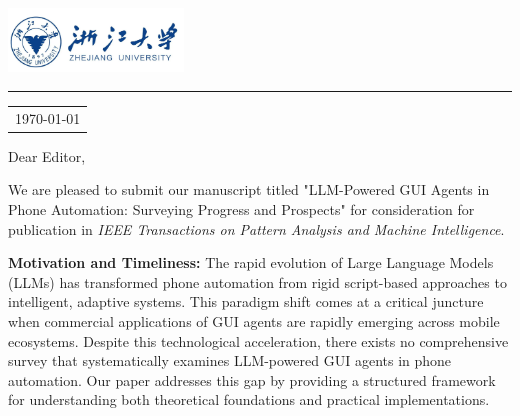 \documentclass{article}
\newcommand{\journal}{IEEE Transactions on Pattern Analysis and Machine Intelligence}
\newcommand{\papertitle}{LLM-Powered GUI Agents in Phone Automation: Surveying Progress and Prospects}
\begin{document}
\includegraphics[width=0.35\textwidth]{templete/zjulogo.png} %
\vspace{-1.5em} %
\rule{\linewidth}{1pt} %
\vspace{0.8em} %


\hfill
\begin{tabular}{l @{}}
\hfill \today \\ %
\end{tabular}

\vspace{0.5em} %


Dear Editor,

\vspace{0.5em} %


We are pleased to submit our manuscript titled "\papertitle" for consideration for publication in \textit{\journal}.

\textbf{Motivation and Timeliness:} The rapid evolution of Large Language Models (LLMs) has transformed phone automation from rigid script-based approaches to intelligent, adaptive systems. This paradigm shift comes at a critical juncture when commercial applications of GUI agents are rapidly emerging across mobile ecosystems. Despite this technological acceleration, there exists no comprehensive survey that systematically examines LLM-powered GUI agents in phone automation. Our paper addresses this gap by providing a structured framework for understanding both theoretical foundations and practical implementations.
\end{document}
